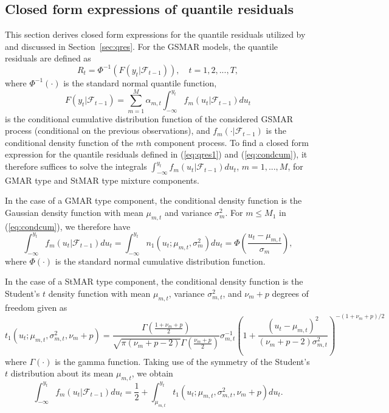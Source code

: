 \documentclass[nojss]{jss} %
\begin{document}
\begin{appendix}
\section{Closed form expressions of quantile residuals}\label{sec:qresexpr}

This section derives closed form expressions for the quantile residuals utilized by  and discussed in Section~\ref{sec:qres}. For the GSMAR models, the quantile residuals are defined as
%
\begin{equation}\label{eq:qres1}
R_t=\Phi^{-1}(F(y_t|\mathcal{F}_{t-1})), \quad t=1,2,...,T,
\end{equation}
%
where $\Phi^{-1}(\cdot)$ is the standard normal quantile function,
%
\begin{equation}\label{eq:condcum}
F(y_t|\mathcal{F}_{t-1})= \sum_{m=1}^M\alpha_{m,t}\int_{-\infty}^{y_t} f_m(u_t|\mathcal{F}_{t-1})du_t
\end{equation}
%
is the conditional cumulative distribution function of the considered GSMAR process (conditional on the previous observations),
and $f_m(\cdot|\mathcal{F}_{t-1})$ is the conditional density function of the $m$th component process. To find a closed form expression for the quantile residuals defined in (\ref{eq:qres1}) and (\ref{eq:condcum}), it therefore suffices to solve the integrals $\int_{-\infty}^{y_t} f_m(u_t|\mathcal{F}_{t-1})du_t$, $m=1,...,M$, for GMAR type and StMAR type mixture components.
%

In the case of a GMAR type component, the conditional density function is the Gaussian density function with mean $\mu_{m,t}$ and variance $\sigma_m^2$. For $m\leq M_1$ in (\ref{eq:condcum}), we therefore have
%
\begin{equation}
\int_{-\infty}^{y_t} f_m(u_t|\mathcal{F}_{t-1})du_t = \int_{-\infty}^{y_t}n_1(u_t;\mu_{m,t},\sigma_m^2) du_t= \Phi\left(\frac{u_t - \mu_{m,t}}{\sigma_m}\right),
\end{equation}
%
where $\Phi (\cdot)$ is the standard normal cumulative distribution function.

In the case of a StMAR type component, the conditional density function is the Student's $t$ density function with mean $\mu_{m,t}$, variance $\sigma_{m,t}^2$, and $\nu_m + p$ degrees of freedom given as \cite[Appendix A]{Meitz+Preve+Saikkonen:2021}
%
\begin{equation}
t_1(u_t;\mu_{m,t},\sigma_{m,t}^2,\nu_m+p) = \frac{\Gamma\left(\frac{1 + \nu_m + p}{2}\right)}{\sqrt{\pi(\nu_m + p - 2)}\Gamma\left(\frac{\nu_m + p}{2}\right)}\sigma_{m,t}^{-1}\left(1 + \frac{(u_t - \mu_{m,t})^2}{(\nu_m + p - 2)\sigma_{m,t}^2} \right)^{-(1 + \nu_m + p)/2}
\end{equation}
%
where $\Gamma\left(\cdot\right)$ is the gamma function. Taking use of the symmetry of the Student's $t$ distribution about its mean $\mu_{m,t}$, we obtain
%
\begin{equation}\label{eq:int1}
\int_{-\infty}^{y_t} f_m(u_t|\mathcal{F}_{t-1})du_t = \frac{1}{2} + \int_{\mu_{m,t}}^{y_t}t_1(u_t;\mu_{m,t},\sigma_{m,t}^2,\nu_m+p) du_t.
\end{equation}
%


\end{appendix}
\end{document}
